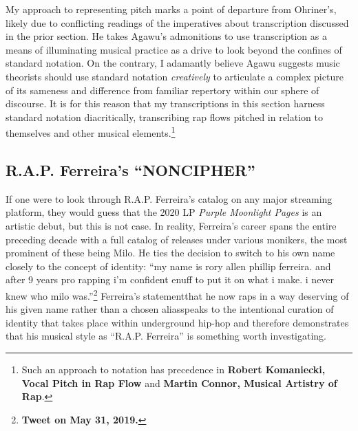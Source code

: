 My approach to representing pitch marks a point of departure from Ohriner's, likely due to conflicting
readings of the imperatives about transcription discussed in the prior section. He takes Agawu's
admonitions to use transcription as a means of illuminating musical practice as a drive to look beyond
the confines of standard notation. On the contrary, I adamantly believe Agawu suggests music theorists 
should use standard notation \textit{creatively} to articulate a complex picture of its sameness and 
difference from familiar repertory within our sphere of discourse. It is for this reason that my 
transcriptions in this section harness standard notation diacritically, transcribing rap flows pitched
in relation to themselves and other musical elements.\footnote{
    Such an approach to notation has precedence in \textbf{Robert Komaniecki, Vocal Pitch in Rap Flow} and 
    \textbf{Martin Connor, Musical Artistry of Rap}.}

\subsection*{\centering R.A.P. Ferreira's ``NONCIPHER''}

If one were to look through R.A.P. Ferreira's catalog on any major streaming platform, they would
guess that the 2020 LP \textit{Purple Moonlight Pages} is an artistic debut, but this is not case.
In reality, Ferreira's career spans the entire preceding decade with a full catalog of releases under
various monikers, the most prominent of these being Milo. He ties the decision to switch to his own
name closely to the concept of identity: ``my name is rory allen phillip ferreira. and after 9 years
pro rapping i'm confident enuff to put it on what i make. i never knew who milo was.''\footnote{
    \textbf{Tweet on May 31, 2019.}}
Ferreira's statement\textemdash that he now raps in a way deserving of his given name rather than 
a chosen alias\textemdash speaks to the intentional curation of identity that takes place within 
underground hip-hop and therefore demonstrates that his musical style as ``R.A.P. Ferreira'' is 
something worth investigating.

